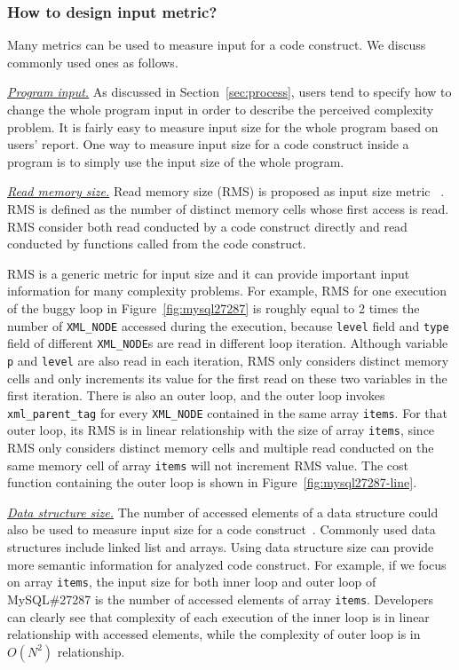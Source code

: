 \subsubsection{How to design input metric?}
Many metrics can be used to measure input for a code construct. 
We discuss commonly used ones as follows.

\underline{\textit{Program input.}}
As discussed in Section~\ref{sec:process}, 
users tend to specify how to change the whole program 
input in order to describe the perceived complexity problem.
It is fairly easy to measure input size for the whole program based on users' report.
One way to measure input size for a code construct inside a program
is to simply use the input size of the whole program. 

\underline{\textit{Read memory size.}}
Read memory size (RMS) is proposed as input size metric~\cite{Aprof1,Aprof2} . 
RMS is defined as the number of distinct memory cells 
whose first access is read. 
RMS consider both read conducted by a code construct directly 
and read conducted by 
functions called from the code construct. 

RMS is a generic metric for input size 
and it can provide important input information for many complexity problems.   
For example, 
RMS for one execution of
the buggy loop in Figure~\ref{fig:mysql27287}
is roughly equal to 2 times the number of \texttt{XML\_NODE} 
accessed during the execution, 
because \texttt{level} field and \texttt{type} field of 
different \texttt{XML\_NODE}s are read in different loop iteration.
Although variable \texttt{p} and \texttt{level} are also read in each iteration,
RMS only considers distinct memory cells and 
only increments its value for the first read on these two variables in the first iteration. 
There is also an outer loop, 
and the outer loop invokes \texttt{xml\_parent\_tag} 
for every \texttt{XML\_NODE} contained
in the same array \texttt{items}. 
For that outer loop, its RMS is in linear relationship 
with the size of array \texttt{items}, 
since RMS only considers distinct memory cells 
and multiple read conducted on the same memory 
cell of array \texttt{items} will not increment RMS value. 
The cost function containing the outer loop is shown 
in Figure~\ref{fig:mysql27287-line}.

{\underline{\textit{Data structure size.}}}
The number of accessed elements of a data 
structure could also be used to measure 
input size for a code construct~\cite{AlgoProf}. 
Commonly used data structures include linked list and arrays.
Using data structure size can provide more semantic information for 
analyzed code construct.
For example, if we focus on array \texttt{items}, 
the input size for both 
inner loop and outer loop of MySQL\#27287 is 
the number of accessed elements of array \texttt{items}.
Developers can clearly see that complexity of each execution 
of the inner loop is in linear relationship with accessed elements, 
while the complexity of outer loop is in $O(N^2)$ relationship. 


